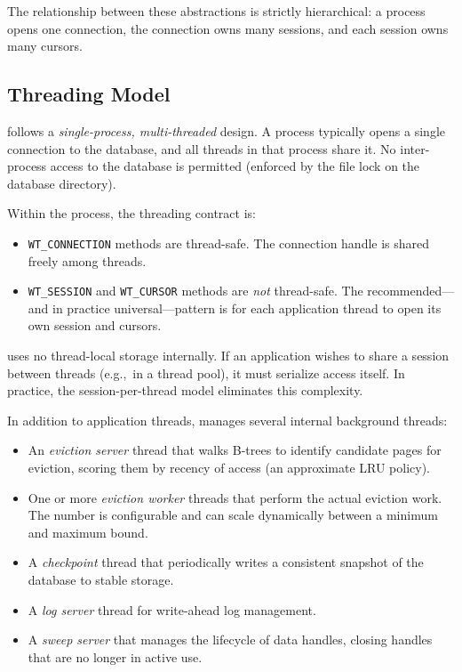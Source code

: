 The relationship between these abstractions is strictly hierarchical: a process opens one connection, the connection owns many sessions, and each session owns many cursors.

\subsection{Threading Model}
\label{sec:wt-threading}

\wt{} follows a \emph{single-process, multi-threaded} design.
A process typically opens a single connection to the database, and all threads in that process share it.
No inter-process access to the database is permitted (enforced by the file lock on the database directory).

Within the process, the threading contract is:

\begin{itemize}
  \item \texttt{WT\_CONNECTION} methods are thread-safe.  The connection handle
    is shared freely among threads.
  \item \texttt{WT\_SESSION} and \texttt{WT\_CURSOR} methods are \emph{not}
    thread-safe.  The recommended---and in practice universal---pattern is for each application thread to open its own session and cursors.
\end{itemize}

\wt{} uses no thread-local storage internally.
If an application wishes to share a session between threads (e.g.,\ in a thread pool), it must serialize access itself.
In practice, the session-per-thread model eliminates this complexity.

In addition to application threads, \wt{} manages several internal background threads:

\begin{itemize}
  \item An \emph{eviction server} thread that walks B-trees to identify
    candidate pages for eviction, scoring them by recency of access
    (an approximate LRU policy).
  \item One or more \emph{eviction worker} threads that perform the actual
    eviction work.  The number is configurable and can scale dynamically
    between a minimum and maximum bound.
  \item A \emph{checkpoint} thread that periodically writes a consistent
    snapshot of the database to stable storage.
  \item A \emph{log server} thread for write-ahead log management.
  \item A \emph{sweep server} that manages the lifecycle of data handles,
    closing handles that are no longer in active use.
\end{itemize}

